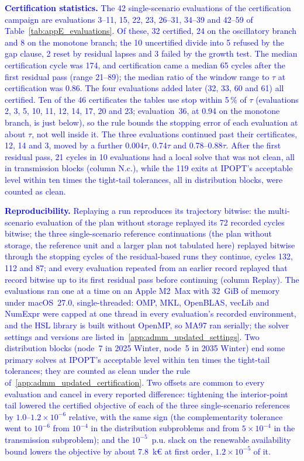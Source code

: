 \documentclass[preprint,12pt]{elsarticle}
\begin{document}
\textcolor{blue}{
    \textbf{Certification statistics.} The 42 single-scenario evaluations of the certification campaign are evaluations 3--11, 15, 22, 23, 26--31, 34--39 and 42--59 of Table~\ref{tab:appE_evaluations}. Of these, 32 certified, 24 on the oscillatory branch and 8 on the monotone branch; the 10 uncertified divide into 5 refused by the gap clause, 2 reset by residual lapses and 3 failed by the growth test. The median certification cycle was 174, and certification came a median 65 cycles after the first residual pass (range 21--89); the median ratio of the window range to $\tau$ at certification was 0.86. The four evaluations added later (32, 33, 60 and 61) all certified. Ten of the 46 certificates the tables use stop within 5\,\% of $\tau$ (evaluations 2, 3, 5, 10, 11, 12, 14, 17, 20 and 23; evaluation~36, at 0.94 on the monotone branch, is just below), so the rule bounds the stopping error of each evaluation at about $\tau$, not well inside it. The three evaluations continued past their certificates, 12, 14 and 3, moved by a further 0.004$\tau$, 0.74$\tau$ and 0.78--0.88$\tau$. After the first residual pass, 21 cycles in 10 evaluations had a local solve that was not clean, all in transmission blocks (column N.c.), while the 119 exits at IPOPT's acceptable level within ten times the tight-tail tolerances, all in distribution blocks, were counted as clean.
}

\textcolor{blue}{
    \textbf{Reproducibility.} Replaying a run reproduces its trajectory bitwise: the multi-scenario evaluation of the plan without storage replayed its 72 recorded cycles bitwise; the three single-scenario reference continuations (the plan without storage, the reference unit and a larger plan not tabulated here) replayed bitwise through the stopping cycles of the residual-based runs they continue, cycles 132, 112 and 87; and every evaluation repeated from an earlier record replayed that record bitwise up to its first residual pass before continuing (column Replay). The evaluations ran one at a time on an Apple M2~Max with 32~GiB of memory under macOS~27.0, single-threaded: OMP, MKL, OpenBLAS, vecLib and NumExpr were capped at one thread in every evaluation's recorded environment, and the HSL library is built without OpenMP, so MA97 ran serially; the solver settings and versions are listed in~\ref{app:admm_updated_settings}. Two distribution blocks (node~7 in 2025 Winter, node~5 in 2035 Winter) end some primary solves at IPOPT's acceptable level within ten times the tight-tail tolerances; they are counted as clean under the rule of~\ref{app:admm_updated_certification}. Two offsets are common to every evaluation and cancel in every reported difference: tightening the interior-point tail lowered the certified objective of each of the three single-scenario references by $1.0$--$1.2 \times 10^{-6}$ relative, with the same sign (the complementarity tolerance went to $10^{-6}$ from $10^{-4}$ in the distribution subproblems and from $5 \times 10^{-4}$ in the transmission subproblem); and the $10^{-5}$~p.u. slack on the renewable availability bound lowers the objective by about 7.8~k\euro{} at first order, $1.2 \times 10^{-5}$ of it.
}
\end{document}

